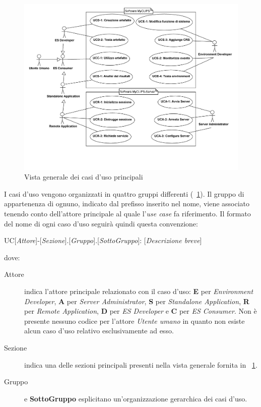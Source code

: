 \begin{figure}
\centering
\includegraphics[width=1.2\textwidth, angle=270]{Immagini/Capitolo2/UseCases/Vista-generale.png}
\caption{Vista generale dei casi d'uso principali}\label{fig:uc-vista-generale}
\end{figure}


I casi d'uso vengono organizzati in quattro gruppi differenti (\figurename~\ref{fig:uc-vista-generale}). Il gruppo di appartenenza di ognuno, indicato dal prefisso inserito nel nome, viene associato tenendo conto dell'attore principale al quale l'\emph{use case} fa riferimento. Il formato del nome di ogni caso d'uso seguirà quindi questa convenzione:
\begin{center}
UC[\emph{Attore}]-[\emph{Sezione}].[\emph{Gruppo}].[\emph{SottoGruppo}]: [\emph{Descrizione breve}]
\end{center}
dove:


\begin{description}
	\item[Attore] indica l'attore principale relazionato con il caso d'uso: \textbf{E} per \emph{Environment Developer}, \textbf{A} per \emph{Server Administrator}, \textbf{S} per \emph{Standalone Application}, \textbf{R} per \emph{Remote Application}, \textbf{D} per \emph{ES Developer} e \textbf{C} per \emph{ES Consumer}. Non è presente nessuno codice per l'attore \emph{Utente umano} in quanto non esiste alcun caso d'uso relativo esclusivamente ad esso.

	\item[Sezione] indica una delle sezioni principali presenti nella vista generale fornita in \figurename~\ref{fig:uc-vista-generale}.
	
	\item[Gruppo] e \textbf{SottoGruppo} esplicitano un'organizzazione gerarchica dei casi d'uso.

\end{description}

